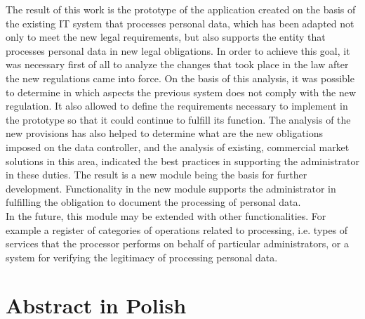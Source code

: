 \documentclass[en, noamssymb]{mgr}
\begin{document}
\indent  The result of this work is the prototype of the application created on the basis of the existing IT system that processes personal data, which has been adapted not only to meet the new legal requirements, but also supports the entity that processes personal data in new legal obligations. In order to achieve this goal, it was necessary first of all to analyze the changes that took place in the law after the new regulations came into force. On the basis of this analysis, it was possible to determine in which aspects the previous system does not comply with the new regulation. It also allowed to define the requirements necessary to implement in the prototype so that it could continue to fulfill its function. The analysis of the new provisions has also helped to determine what are the new obligations imposed on the data controller, and the analysis of existing, commercial market solutions in this area, indicated the best practices in supporting the administrator in these duties. The result is a new module being the basis for further development. Functionality in the new module supports the administrator in fulfilling the obligation to document the processing of personal data.\\
\indent In the future, this module may be extended with other functionalities. For example a register of categories of operations related to processing, i.e. types of services that the processor performs on behalf of particular administrators, or a system for verifying the legitimacy of processing personal data.

\chapter{Abstract in Polish}
\label{sec:StreszczeniePol}
\end{document}
